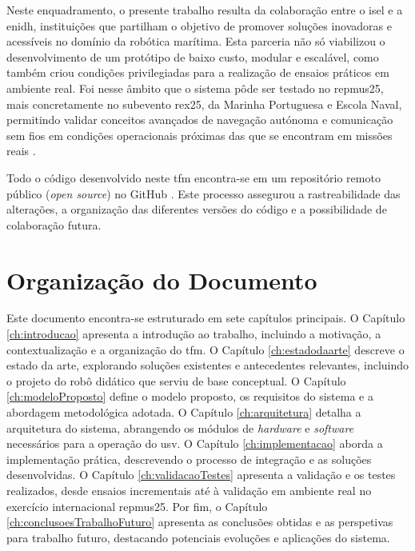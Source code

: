 Neste enquadramento, o presente trabalho resulta da colaboração entre o \gls{isel} e a \gls{enidh}, instituições que partilham o objetivo de promover soluções inovadoras e acessíveis no domínio da robótica marítima. Esta parceria não só viabilizou o desenvolvimento de um protótipo de baixo custo, modular e escalável, como também criou condições privilegiadas para a realização de ensaios práticos em ambiente real. Foi nesse âmbito que o sistema pôde ser testado no \gls{repmus25}, mais concretamente no subevento \gls{rex25}, da Marinha Portuguesa e Escola Naval, permitindo validar conceitos avançados de navegação autónoma e comunicação sem fios em condições operacionais próximas das que se encontram em missões reais \cite{isel-repmus, enidh-repmus, sapo-repmus}.

Todo o código desenvolvido neste \gls{tfm} encontra-se em um repositório remoto público (\emph{open source}) no GitHub \cite{github-usv}. Este processo assegurou a rastreabilidade das alterações, a organização das diferentes versões do código e a possibilidade de colaboração futura.

\section{Organização do Documento}
\label{sec:organizacao}

Este documento encontra-se estruturado em sete capítulos principais. O Capítulo \ref{ch:introducao} apresenta a introdução ao trabalho, incluindo a motivação, a contextualização e a organização do \gls{tfm}. O Capítulo \ref{ch:estadodaarte} descreve o estado da arte, explorando soluções existentes e antecedentes relevantes, incluindo o projeto do robô didático que serviu de base conceptual. O Capítulo \ref{ch:modeloProposto} define o modelo proposto, os requisitos do sistema e a abordagem metodológica adotada. O Capítulo \ref{ch:arquitetura} detalha a arquitetura do sistema, abrangendo os módulos de \emph{hardware} e \emph{software} necessários para a operação do \gls{usv}. O Capítulo \ref{ch:implementacao} aborda a implementação prática, descrevendo o processo de integração e as soluções desenvolvidas. O Capítulo \ref{ch:validacaoTestes} apresenta a validação e os testes realizados, desde ensaios incrementais até à validação em ambiente real no exercício internacional \gls{repmus25}. Por fim, o Capítulo \ref{ch:conclusoesTrabalhoFuturo} apresenta as conclusões obtidas e as perspetivas para trabalho futuro, destacando potenciais evoluções e aplicações do sistema.
